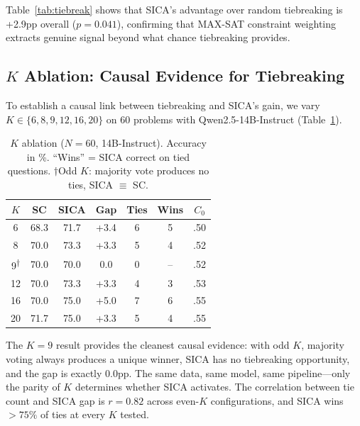 \documentclass[11pt,a4paper]{article}
\begin{document}
Table~\ref{tab:tiebreak} shows that SICA's advantage over random tiebreaking is +2.9pp overall ($p=0.041$), confirming that MAX-SAT constraint weighting extracts genuine signal beyond what chance tiebreaking provides.

\subsection{$K$ Ablation: Causal Evidence for Tiebreaking}
\label{sec:k_ablation}

To establish a causal link between tiebreaking and SICA's gain, we vary $K \in \{6, 8, 9, 12, 16, 20\}$ on 60 problems with Qwen2.5-14B-Instruct (Table~\ref{tab:k_ablation}).

\begin{table}[t]
\centering
\small
\begin{tabular}{ccccccc}
\toprule
$K$ & \textbf{SC} & \textbf{SICA} & \textbf{Gap} & \textbf{Ties} & \textbf{Wins} & $C_0$ \\
\midrule
6 & 68.3 & 71.7 & +3.4 & 6 & 5 & .50 \\
8 & 70.0 & 73.3 & +3.3 & 5 & 4 & .52 \\
9\textsuperscript{$\dagger$} & 70.0 & 70.0 & 0.0 & 0 & -- & .52 \\
12 & 70.0 & 73.3 & +3.3 & 4 & 3 & .53 \\
16 & 70.0 & 75.0 & +5.0 & 7 & 6 & .55 \\
20 & 71.7 & 75.0 & +3.3 & 5 & 4 & .55 \\
\bottomrule
\end{tabular}
\caption{$K$ ablation ($N\!=\!60$, 14B-Instruct). Accuracy in \%. ``Wins'' = SICA correct on tied questions. $\dagger$Odd $K$: majority vote produces no ties, SICA $\equiv$ SC.}
\label{tab:k_ablation}
\end{table}

The $K\!=\!9$ result provides the cleanest causal evidence: with odd $K$, majority voting always produces a unique winner, SICA has no tiebreaking opportunity, and the gap is exactly 0.0pp. The same data, same model, same pipeline---only the parity of $K$ determines whether SICA activates. The correlation between tie count and SICA gap is $r = 0.82$ across even-$K$ configurations, and SICA wins $>75\%$ of ties at every $K$ tested.

\end{document}
